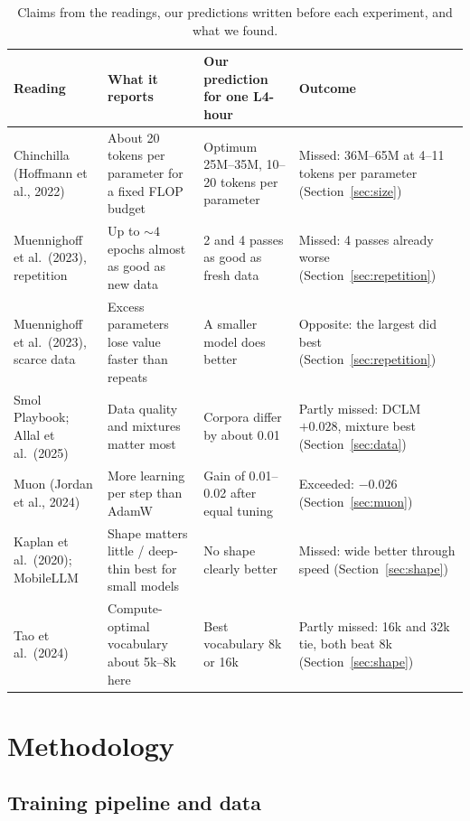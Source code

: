 \documentclass[11pt,a4paper]{article}
\begin{document}
\begin{table}[ht]
\centering\small
\begin{tabularx}{\linewidth}{LLLL}
\toprule
\textbf{Reading} & \textbf{What it reports} & \textbf{Our prediction for one L4-hour} & \textbf{Outcome} \\
\midrule
Chinchilla (Hoffmann et al., 2022) & About 20 tokens per parameter for a fixed FLOP budget & Optimum 25M--35M, 10--20 tokens per parameter & Missed: 36M--65M at 4--11 tokens per parameter (Section~\ref{sec:size}) \\
Muennighoff et al.\ (2023), repetition & Up to ${\sim}4$ epochs almost as good as new data & 2 and 4 passes as good as fresh data & Missed: 4 passes already worse (Section~\ref{sec:repetition}) \\
Muennighoff et al.\ (2023), scarce data & Excess parameters lose value faster than repeats & A smaller model does better & Opposite: the largest did best (Section~\ref{sec:repetition}) \\
Smol Playbook; Allal et al.\ (2025) & Data quality and mixtures matter most & Corpora differ by about 0.01 & Partly missed: DCLM $+0.028$, mixture best (Section~\ref{sec:data}) \\
Muon (Jordan et al., 2024) & More learning per step than AdamW & Gain of 0.01--0.02 after equal tuning & Exceeded: $-0.026$ (Section~\ref{sec:muon}) \\
Kaplan et al.\ (2020); MobileLLM & Shape matters little / deep-thin best for small models & No shape clearly better & Missed: wide better through speed (Section~\ref{sec:shape}) \\
Tao et al.\ (2024) & Compute-optimal vocabulary about 5k--8k here & Best vocabulary 8k or 16k & Partly missed: 16k and 32k tie, both beat 8k (Section~\ref{sec:shape}) \\
\bottomrule
\end{tabularx}
\caption{Claims from the readings, our predictions written before each experiment, and what we found.}
\label{tab:predictions}
\end{table}

\section{Methodology}

\subsection{Training pipeline and data}
\end{document}
